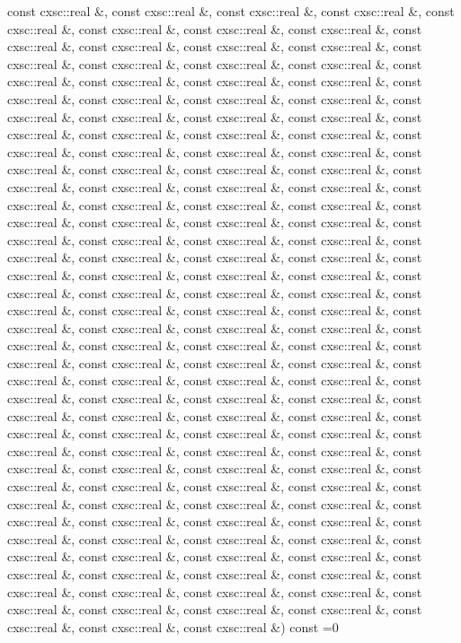 \begin{DoxyCompactItemize}
const cxsc\-::real \&, const cxsc\-::real \&, const cxsc\-::real \&, const cxsc\-::real \&, const cxsc\-::real \&, const cxsc\-::real \&, const cxsc\-::real \&, const cxsc\-::real \&, const cxsc\-::real \&, const cxsc\-::real \&, const cxsc\-::real \&, const cxsc\-::real \&, const cxsc\-::real \&, const cxsc\-::real \&, const cxsc\-::real \&, const cxsc\-::real \&, const cxsc\-::real \&, const cxsc\-::real \&, const cxsc\-::real \&, const cxsc\-::real \&, const cxsc\-::real \&, const cxsc\-::real \&, const cxsc\-::real \&, const cxsc\-::real \&, const cxsc\-::real \&, const cxsc\-::real \&, const cxsc\-::real \&, const cxsc\-::real \&, const cxsc\-::real \&, const cxsc\-::real \&, const cxsc\-::real \&, const cxsc\-::real \&, const cxsc\-::real \&, const cxsc\-::real \&, const cxsc\-::real \&, const cxsc\-::real \&, const cxsc\-::real \&, const cxsc\-::real \&, const cxsc\-::real \&, const cxsc\-::real \&, const cxsc\-::real \&, const cxsc\-::real \&, const cxsc\-::real \&, const cxsc\-::real \&, const cxsc\-::real \&, const cxsc\-::real \&, const cxsc\-::real \&, const cxsc\-::real \&, const cxsc\-::real \&, const cxsc\-::real \&, const cxsc\-::real \&, const cxsc\-::real \&, const cxsc\-::real \&, const cxsc\-::real \&, const cxsc\-::real \&, const cxsc\-::real \&, const cxsc\-::real \&, const cxsc\-::real \&, const cxsc\-::real \&, const cxsc\-::real \&, const cxsc\-::real \&, const cxsc\-::real \&, const cxsc\-::real \&, const cxsc\-::real \&, const cxsc\-::real \&, const cxsc\-::real \&, const cxsc\-::real \&, const cxsc\-::real \&, const cxsc\-::real \&, const cxsc\-::real \&, const cxsc\-::real \&, const cxsc\-::real \&, const cxsc\-::real \&, const cxsc\-::real \&, const cxsc\-::real \&, const cxsc\-::real \&, const cxsc\-::real \&, const cxsc\-::real \&, const cxsc\-::real \&, const cxsc\-::real \&, const cxsc\-::real \&, const cxsc\-::real \&, const cxsc\-::real \&, const cxsc\-::real \&, const cxsc\-::real \&, const cxsc\-::real \&, const cxsc\-::real \&, const cxsc\-::real \&, const cxsc\-::real \&, const cxsc\-::real \&, const cxsc\-::real \&, const cxsc\-::real \&, const cxsc\-::real \&, const cxsc\-::real \&, const cxsc\-::real \&, const cxsc\-::real \&, const cxsc\-::real \&, const cxsc\-::real \&, const cxsc\-::real \&, const cxsc\-::real \&, const cxsc\-::real \&, const cxsc\-::real \&, const cxsc\-::real \&, const cxsc\-::real \&, const cxsc\-::real \&, const cxsc\-::real \&, const cxsc\-::real \&, const cxsc\-::real \&, const cxsc\-::real \&, const cxsc\-::real \&, const cxsc\-::real \&, const cxsc\-::real \&, const cxsc\-::real \&, const cxsc\-::real \&, const cxsc\-::real \&, const cxsc\-::real \&, const cxsc\-::real \&, const cxsc\-::real \&, const cxsc\-::real \&, const cxsc\-::real \&, const cxsc\-::real \&, const cxsc\-::real \&, const cxsc\-::real \&, const cxsc\-::real \&, const cxsc\-::real \&, const cxsc\-::real \&, const cxsc\-::real \&, const cxsc\-::real \&, const cxsc\-::real \&, const cxsc\-::real \&, const cxsc\-::real \&, const cxsc\-::real \&, const cxsc\-::real \&, const cxsc\-::real \&, const cxsc\-::real \&, const cxsc\-::real \&, const cxsc\-::real \&, const cxsc\-::real \&, const cxsc\-::real \&, const cxsc\-::real \&, const cxsc\-::real \&, const cxsc\-::real \&, const cxsc\-::real \&) const =0

\end{DoxyCompactItemize}
